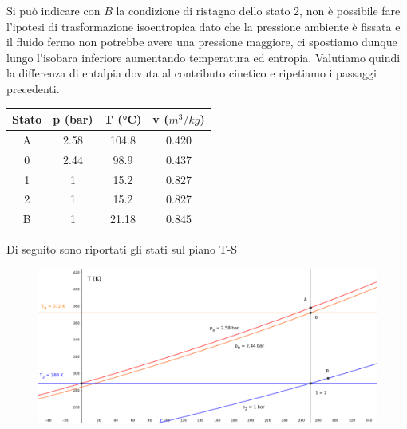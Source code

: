 \documentclass[a4paper,12pt]{article}
\begin{document}
Si può indicare con $B$ la condizione di ristagno dello stato 2, non è possibile fare l'ipotesi di trasformazione isoentropica dato che la pressione ambiente è fissata
e il fluido fermo non potrebbe avere una pressione maggiore, ci spostiamo dunque lungo l'isobara inferiore aumentando temperatura ed entropia.
Valutiamo quindi la differenza di entalpia dovuta al contributo cinetico e ripetiamo i passaggi precedenti.
\begin{center}
    \begin{tabular}{c|c|c|c}
        Stato   &p (bar)    &T (°C) &v ($m^3/kg$) \\ \hline
        A       &2.58       &104.8  &0.420  \\
        0       &2.44       &98.9   &0.437  \\
        1       &1          &15.2   &0.827  \\
        2       &1          &15.2   &0.827  \\
        B       &1          &21.18  &0.845
    \end{tabular}
\end{center}
Di seguito sono riportati gli stati sul piano T-S
\begin{figure}[H]
    \centering
    \includegraphics[width=.90\linewidth]{media/trasformazioni_TS_azione.png}
\end{figure}
\end{document}
